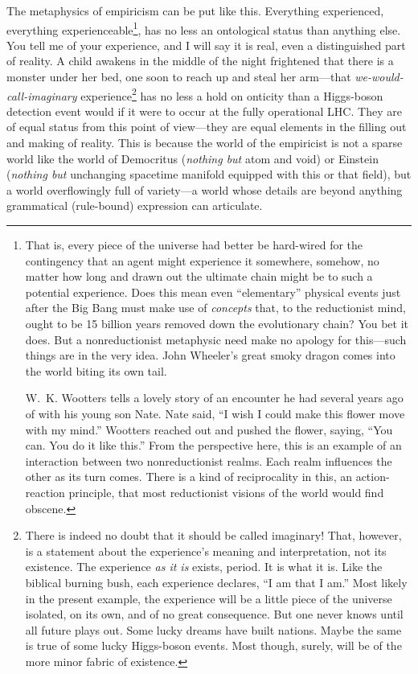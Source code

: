 The metaphysics of empiricism can be put like this.  Every\-thing experienced, everything experienceable\footnote{That is, every piece of the universe had better be hard-wired for the contingency that an agent might experience it somewhere, somehow, no matter how long and drawn out the ultimate chain might be to such a potential experience.  Does this mean even ``elementary'' physical events just after the Big Bang must make use of {\it concepts\/} that, to the reductionist mind, ought to be 15 billion years removed down the evolutionary chain?  You bet it does.  But a nonreductionist metaphysic need make no apology for this---such things are in the very idea.  John Wheeler's great smoky dragon \cite{Miller84} comes into the world biting its own tail.%

W.~K. Wootters tells a lovely story of an encounter he had several years ago of with his young son Nate.  Nate said, ``I wish I could make this flower move with my mind.''  Wootters reached out and pushed the flower, saying, ``You can. You do it like this.''  From the perspective here, this is an example of an interaction between two nonreductionist realms.  Each realm influences the other as its turn comes.  There is a kind of reciprocality in this, an action-reaction principle, that most reductionist visions of the world would find obscene.},
has no less an ontological status than anything else.  You tell me of your experience, and I will say it is real, even a distinguished part of reality.  A child awakens in the middle of the night frightened that there is a monster under her bed, one soon to reach up and steal her arm---that {\it we-would-call-imaginary\/} experience\footnote{There is indeed no doubt that it should be called imaginary!  That, however, is a statement about the experience's meaning and interpretation, not its existence.  The ex\-pe\-rience {\it as it is\/} exists, period. It is what it is.  Like the biblical burning bush, each ex\-pe\-rience declares, ``I am that I am.''  Most likely in the present example, the experience will be a little piece of the universe isolated, on its own, and of no great consequence.  But one never knows until all future plays out.  Some lucky dreams have built nations.  Maybe the same is true of some lucky Higgs-boson events.  Most though, surely, will be of the more minor fabric of existence.} has no less a hold on onticity than a Higgs-boson detection event would if it were to occur at the fully operational LHC.  They are of equal status from this point of view---they are equal elements in the filling out and making of reality.  This is because the world of the empiricist is not a sparse world like the world of Democritus ({\it nothing but\/} atom and void) or Einstein ({\it nothing but\/} unchanging spacetime manifold equipped with this or that field), but a world overflowingly full of variety---a world whose details are beyond anything grammatical (rule-bound) expression can articulate.

